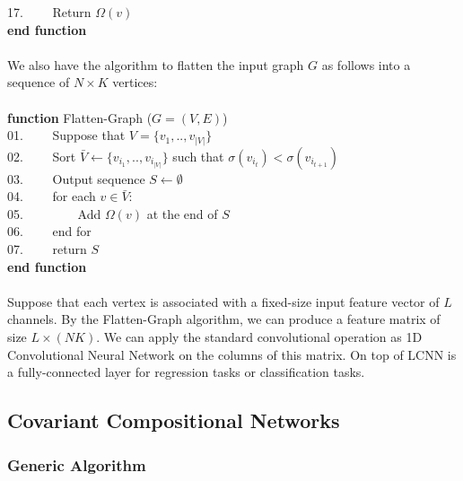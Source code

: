 \documentclass[a4paper]{article}
\begin{document}
17. \ \ \ \ Return $\Omega(v)$ \\
\textbf{end function} \\ \\
We also have the algorithm to flatten the input graph $G$ as follows into a sequence of $N \times K$ vertices: \\ \\
\textbf{function} Flatten-Graph ($G = (V, E)$) \\
01. \ \ \ \ Suppose that $V = \{v_1, .., v_{|V|}\}$ \\
02. \ \ \ \ Sort $\bar{V} \leftarrow \{v_{i_1}, .., v_{i_{|V|}}\}$ such that $\sigma(v_{i_t}) < \sigma(v_{i_{t + 1}})$ \\
03. \ \ \ \ Output sequence $S \leftarrow \emptyset$ \\
04. \ \ \ \ for each $v \in \bar{V}$: \\
05. \ \ \ \ \ \ \ \ Add $\Omega(v)$ at the end of $S$ \\
06. \ \ \ \ end for \\
07. \ \ \ \ return $S$ \\
\textbf{end function} \\ \\
Suppose that each vertex is associated with a fixed-size input feature vector of $L$ channels. By the Flatten-Graph algorithm, we can produce a feature matrix of size $L \times (NK)$. We can apply the standard convolutional operation as 1D Convolutional Neural Network on the columns of this matrix. On top of LCNN is a fully-connected layer for regression tasks or classification tasks.  

\subsection{Covariant Compositional Networks}

\subsubsection{Generic Algorithm}
\end{document}

